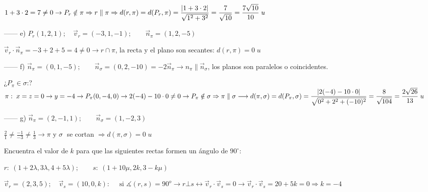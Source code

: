 \begin{proofw}
\noindent $1+3\cdot 2=7\neq 0 \to P_r \notin \pi \Rightarrow r \parallel \pi \Rightarrow d(r,\pi)=d(P_r,\pi)=\dfrac {\abs{1+3\cdot 2}}{\sqrt{1^2+3^2}}=\dfrac 7 {\sqrt{10}}=\dfrac {7\sqrt{10}}{10}\; u$

\noindent ------ e) $P_r(1,2,1); \quad \vec v_r=(-3,1,-1);\qquad \vec n_{\pi}=(1,2,-5)$

\noindent $\vec v_r \cdot \vec n_{\pi}=-3+2+5=4\neq 0 \to r\cap \pi$, la recta y el plano son secantes: $d(r,\pi)=0\; u$

\noindent ------ f) $\vec n_{\pi}=(0,1,-5);\qquad \vec n_{\sigma}=(0,2,-10)=-2\vec n_{\pi} \to n_{\pi} \parallel \vec n_{\sigma}$, los planos son paralelos o coincidentes.

\noindent ¿$P_{\pi} \in \sigma$:? $\pi:\; x=z=0 \to y=-4 \to P_{\pi}(0,-4,0) \to 2(-4)-10\cdot 0\neq 0 \to P_{\pi} \notin \sigma \Rightarrow \pi \parallel \sigma \longrightarrow d(\pi,\sigma)=d(P_{\pi},\sigma)= \dfrac {\abs{2(-4)-10\cdot 0}}{\sqrt{0^2+2^2+(-10)^2}}=\dfrac {8}{\sqrt{104}}=\dfrac{2\sqrt{26}}{13}\; u$ 

\noindent ------ g) $\vec n_{\pi}=(2,-1,1);\qquad \vec n_{\sigma}=(1,-2,3)$

\noindent $\frac 2 1 \neq \frac {-1}{-3} \neq \frac 1 3 \to \pi \text{ y } \sigma\;$ se cortan $\Rightarrow d(\pi,\sigma)=0\; u$
\end{proofw}

\begin{ejre}
Encuentra el valor de $k$ para que las siguientes rectas formen un ángulo de $90^{\circ}$:

$r:\; (1+2\lambda,3\lambda,4+5\lambda);\qquad s:\; (1+10\mu,2k,3-k\mu)$
\end{ejre}
\begin{proofw}\renewcommand{\qedsymbol}{$\diamond$}	
\noindent $\vec v_r=(2,3,5);\quad  \vec v_s=(10,0,k):\quad \text{ si }\measuredangle (r,s)=90^o \to  r\bot s \leftrightarrow \vec v_r\cdot \vec v_s=0 \to \vec v_r \cdot \vec v_s=20+5k=0 \Rightarrow k=-4$	
\end{proofw}

